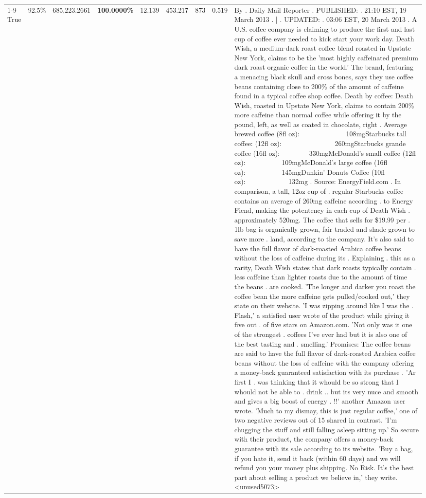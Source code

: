 \begin{table}[H]
{\begin{tabular}{lllrlllll}
\cline{1-9}
True & 92.5\% & 685,223.2661 & \bfseries \color{red} 100.0000\% & 12.139 & 453.217 & 873 & 0.519 & By . Daily Mail Reporter . PUBLISHED: . 21:10 EST, 19 March 2013 . | . UPDATED: . 03:06 EST, 20 March 2013 . A U.S. coffee company is claiming to produce the first and last cup of coffee ever needed to kick start your work day. Death Wish, a medium-dark roast coffee blend roasted in Upstate New York, claims to be the 'most highly caffeinated premium dark roast organic coffee in the world.' The brand, featuring a menacing black skull and cross bones, says they use coffee beans containing close to 200\% of the amount of caffeine found in a typical coffee shop coffee. Death by coffee: Death Wish, roasted in Upstate New York, claims to contain 200\% more caffeine than normal coffee while offering it by the pound, left, as well as coated in chocolate, right . Average brewed coffee (8fl oz):              108mgStarbucks tall coffee: (12fl oz):                260mgStarbucks grande coffee (16fl oz):         330mgMcDonald's small coffee (12fl oz):           109mgMcDonald's large coffee (16fl oz):           145mgDunkin' Donuts Coffee (10fl oz):             132mg . Source: EnergyField.com . In comparison, a tall, 12oz cup of . regular Starbucks coffee contains an average of 260mg caffeine according . to Energy Fiend, making the potentency in each cup of Death Wish . approximately 520mg. The coffee that sells for \$19.99 per . 1lb bag is organically grown, fair traded and shade grown to save more . land, according to the company. It's also said to have the full flavor of dark-roasted Arabica coffee beans without the loss of caffeine during its . Explaining . this as a rarity, Death Wish states that dark roasts typically contain . less caffeine than lighter roasts due to the amount of time the beans . are cooked. 'The longer and darker you roast the coffee bean the more caffeine gets pulled/cooked out,' they state on their website. 'I was zipping around like I was the . Flash,' a satisfied user wrote of the product while giving it five out . of five stars on Amazon.com. 'Not only was it one of the strongest . coffees I've ever had but it is also one of the best tasting and . smelling.’ Promises: The coffee beans are said to have the full flavor of dark-roasted Arabica coffee beans without the loss of caffeine with the company offering a money-back guaranteed satisfaction with its purchase . 'Ar first I . was thinking that it whould be so strong that I whould not be able to . drink .. but its very nuce and smooth and gives a big boost of energy . !!' another Amazon user wrote. 'Much to my dismay, this is just regular coffee,' one of two negative reviews out of 15 shared in contrast. 'I'm chugging the stuff and still falling asleep sitting up.' So secure with their product, the company offers a money-back guarantee with its sale according to its website. 'Buy a bag, if you hate it, send it back (within 60 days) and we will refund you your money plus shipping. No Risk. It’s the best part about selling a product we believe in,' they write.<unused5073> \\

\end{tabular}}
\end{table}
